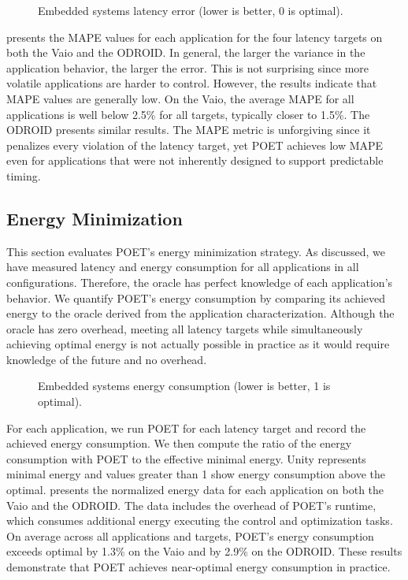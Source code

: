 \begin{figure}[t]
  \centering
    
  \caption{Embedded systems latency error (lower is better, 0 is optimal).}
  \label{fig:poet-embedded-mape}
\end{figure}

 presents the MAPE values for each application for the four latency targets on both the Vaio and the ODROID.
In general, the larger the variance in the application behavior, the larger the error.
This is not surprising since more volatile applications are harder to control.
However, the results indicate that MAPE values are generally low.
On the Vaio, the average MAPE for all applications is well below 2.5\% for all targets, typically closer to 1.5\%.
The ODROID presents similar results.
The MAPE metric is unforgiving since it penalizes every violation of the latency target, yet POET achieves low MAPE even for applications that were not inherently designed to support predictable timing.


\subsection{Energy Minimization}

This section evaluates POET's energy minimization strategy.
As discussed, we have measured latency and energy consumption for all applications in all configurations.
Therefore, the oracle has perfect knowledge of each application's behavior.
We quantify POET's energy consumption by comparing its achieved energy to the oracle derived from the application characterization.
Although the oracle has zero overhead, meeting all latency targets while simultaneously achieving optimal energy is not actually possible in practice as it would require knowledge of the future and no overhead.


\begin{figure}[t]
  \centering
    
  \caption{Embedded systems energy consumption (lower is better, 1 is optimal).}
  \label{fig:poet-embedded-ee}
\end{figure}

For each application, we run POET for each latency target and record the achieved energy consumption.
We then compute the ratio of the energy consumption with POET to the effective minimal energy.
Unity represents minimal energy and values greater than 1 show energy consumption above the optimal.
 presents the normalized energy data for each application on both the Vaio and the ODROID.
The data includes the overhead of POET's runtime, which consumes additional energy executing the control and optimization tasks.
On average across all applications and targets, POET's energy consumption exceeds optimal by 1.3\% on the Vaio and by 2.9\% on the ODROID.
These results demonstrate that POET achieves near-optimal energy consumption in practice.

